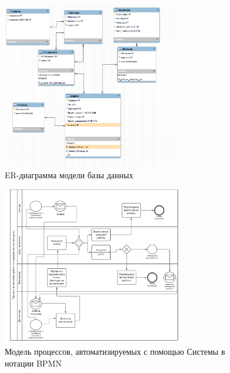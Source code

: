 \begin{figure}[h]
\centering
\includegraphics[width=0.7\textwidth]{Images/model.png}
\caption{ER-диаграмма модели базы данных}
\end{figure}



\begin{figure}[h]
\centering
\includegraphics[width=0.7\textwidth]{Images/process.png}
\caption{Модель процессов, автоматизируемых с помощью Системы в нотации BPMN}
\end{figure}


